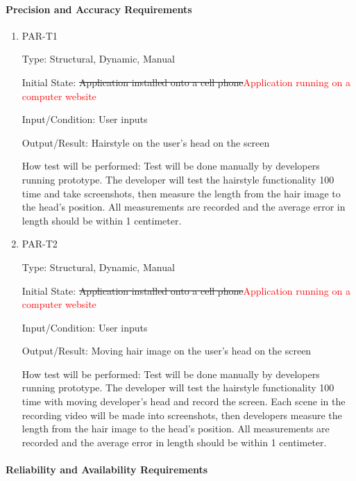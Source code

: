 \documentclass[12pt, titlepage]{article}
\begin{document}
\paragraph{Precision and Accuracy Requirements}

\begin{enumerate}

\item{PAR-T1\\}

Type: Structural, Dynamic, Manual
					
Initial State: \sout{Application installed onto a cell phone}\textcolor{red}{Application running on a computer website}
					
Input/Condition: User inputs
					
Output/Result: Hairstyle on the user's head on the screen
					
How test will be performed: Test will be done manually by developers running prototype. The developer will test the hairstyle functionality 100 time and take screenshots, then measure the length from the hair image to the head's position. All measurements are recorded and the average error in length should be within 1 centimeter. 
					
\item{PAR-T2\\}

Type: Structural, Dynamic, Manual
					
Initial State: \sout{Application installed onto a cell phone}\textcolor{red}{Application running on a computer website}
					
Input/Condition: User inputs
					
Output/Result: Moving hair image on the user's head on the screen
					
How test will be performed: Test will be done manually by developers running prototype. The developer will test the hairstyle functionality 100 time with moving developer's head and record the screen. Each scene in the recording video will be made into screenshots, then developers measure the length from the hair image to the head's position. All measurements are recorded and the average error in length should be within 1 centimeter.

\end{enumerate}

\paragraph{Reliability and Availability Requirements}
\end{document}
